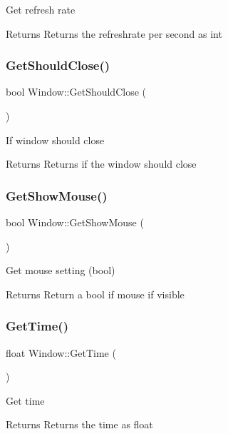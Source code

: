 Get refresh rate \begin{DoxyReturn}{Returns}
Returns the refreshrate per second as int 
\end{DoxyReturn}
\mbox{\label{class_window_af246bcd5b801ea3f10a3f66114e08ef7}} 
\subsubsection{\texorpdfstring{GetShouldClose()}{GetShouldClose()}}
{\footnotesize\ttfamily bool Window\+::\+Get\+Should\+Close (\begin{DoxyParamCaption}{ }\end{DoxyParamCaption})}

If window should close \begin{DoxyReturn}{Returns}
Returns if the window should close 
\end{DoxyReturn}
\mbox{\label{class_window_a20848a2e0ef94a387707738917dd76d6}} 
\subsubsection{\texorpdfstring{GetShowMouse()}{GetShowMouse()}}
{\footnotesize\ttfamily bool Window\+::\+Get\+Show\+Mouse (\begin{DoxyParamCaption}{ }\end{DoxyParamCaption})}

Get mouse setting (bool) \begin{DoxyReturn}{Returns}
Return a bool if mouse if visible 
\end{DoxyReturn}
\mbox{\label{class_window_af311ca905efe6256241b8076c0cef181}} 
\subsubsection{\texorpdfstring{GetTime()}{GetTime()}}
{\footnotesize\ttfamily float Window\+::\+Get\+Time (\begin{DoxyParamCaption}{ }\end{DoxyParamCaption})}

Get time \begin{DoxyReturn}{Returns}
Returns the time as float 
\end{DoxyReturn}
\mbox{\label{class_window_a5b19fe2f1cb52d0321771b305ec06b93}} 
